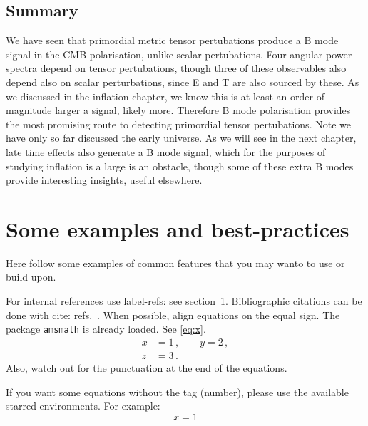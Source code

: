 \documentclass[a4paper,11pt]{article}
\begin{document}
\subsection{Summary}

We have seen that primordial metric tensor pertubations produce a B mode signal in the CMB polarisation, unlike scalar pertubations. Four angular power spectra depend on tensor pertubations, though three of these observables also depend also on scalar perturbations, since E and T are also sourced by  these. As we discussed in the inflation chapter, we know this is at least an order of magnitude larger a signal, likely more. Therefore B mode polarisation provides the most promising route to detecting primordial tensor pertubations. Note we have only so far discussed the early universe. As we will see in the next chapter, late time effects also generate a B mode signal, which for the purposes of studying inflation is a large is an obstacle, though some of these extra B modes provide interesting insights, useful elsewhere.














\section{Some examples and best-practices}
\label{sec:intro}

Here follow some examples of common features that you may wanto to use
or build upon.

For internal references use label-refs: see section~\ref{sec:intro}.
Bibliographic citations can be done with cite: refs.~\cite{a,b,c}.
When possible, align equations on the equal sign. The package
\texttt{amsmath} is already loaded. See \eqref{eq:x}.
\begin{equation}
\label{eq:x}
\begin{split}
x &= 1 \,,
\qquad
y = 2 \,,
\\
z &= 3 \,.
\end{split}
\end{equation}
Also, watch out for the punctuation at the end of the equations.


If you want some equations without the tag (number), please use the available
starred-environments. For example:
\begin{equation*}
x = 1
\end{equation*}
\end{document}
